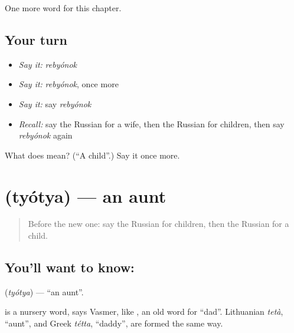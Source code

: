 \begin{grammarlens}[title={What you've built}]
One more word for this chapter.
\end{grammarlens}

\subsection*{Your turn}
\begin{itemize}
\raggedright
  \item \emph{Say it:} \emph{rebyónok}
  \item \emph{Say it:} \emph{rebyónok}, once more
  \item \emph{Say it:} say \emph{rebyónok}
  \item \emph{Recall:} say the Russian for a wife, then the Russian for children, then say \emph{rebyónok} again
\end{itemize}

\begin{tcolorbox}[breakable,colback=teal!4,colframe=teal!35!black,title={Before you move on}]
What does  mean? (\textquotedblleft{}A child\textquotedblright{}.) Say it once more.
\end{tcolorbox}
\section[\texorpdfstring{\ru{тётя} (tyótya)}{тётя (tyótya)}]{ (tyótya) — an aunt}

\label{lesson:RU-C36-aunt}



\begin{quote}
Before the new one: say the Russian for children, then the Russian for a child.
\end{quote}

\subsection*{You'll want to know: }
\textbf{} (\emph{tyótya}) — \textquotedblleft{}an aunt\textquotedblright{}.

\begin{cousinweb}
\textbf{} is a nursery word, says Vasmer, like \emph{}, an old word for \textquotedblleft{}dad\textquotedblright{}. Lithuanian \emph{tetà}, \textquotedblleft{}aunt\textquotedblright{}, and Greek \emph{tétta}, \textquotedblleft{}daddy\textquotedblright{}, are formed the same way.
\end{cousinweb}

